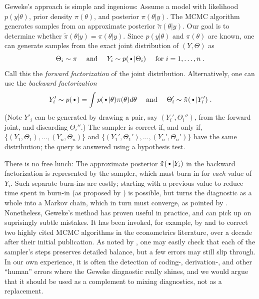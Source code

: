 \documentclass{article}
\newcommand{\argdot}{{\,\vcenter{\hbox{\tiny$\bullet$}}\,}}%
\begin{document}
Geweke's approach is simple and ingenious:
Assume a model with 
likelihood $p(y|\theta)$, prior density $\pi(\theta)$, and posterior
$\pi(\theta|y)$. The MCMC algorithm generates samples from an
approximate posterior $\tilde{\pi}(\theta|y)$. Our goal is to 
determine whether $\tilde{\pi}(\theta|y)=\pi(\theta|y)$. 
Since $p(y|\theta)$ and $\pi(\theta)$ are known, one can generate
samples from the exact joint distribution of $(Y,\Theta)$ as
\begin{equation}
  \Theta_i\sim \pi
  \quad\text{ and }\quad
  Y_i\sim p(\argdot|\Theta_i)\quad\text{ for }i=1,\ldots,n\;.
  \label{eq:ancestralsampling}
\end{equation}
Call this the \emph{forward factorization} of the joint distribution.
Alternatively, one can use the \emph{backward factorization}
\begin{equation*}
  Y'_i\sim p(\argdot)=\int p(\argdot|\theta)\pi(\theta)d\theta
  \quad\text{ and }\quad
  \Theta'_i\sim\tilde{\pi}(\argdot|Y'_i)\;.
\end{equation*}
(Note $Y'_i$ can be generated by drawing a pair, say $(Y_i',\Theta_i'')$, from the forward joint,
and discarding $\Theta_i''$.) The sampler is correct if, and only if, $\{(Y_1,\Theta_1),\ldots,(Y_n,\Theta_n)\}$
and $\{(Y_1',\Theta_1'),\ldots,(Y_n',\Theta_n')\}$ have the same distribution; 
the query is answered using a hypothesis test.

There is no free lunch: The approximate posterior
$\tilde{\pi}(\argdot|Y_i)$ in the backward factorization
is represented by the sampler, which must burn in for \emph{each}
value of $Y_i$. Such separate burn-ins are costly; starting with a previous value to reduce time spent in burn-in (as proposed by \cite{geweke_getting_2004}) is possible, 
but turns the diagnostic as a whole into a Markov chain,
 which in turn must converge, as pointed by \citet{talts_validating_2018}.
Nonetheless, Geweke's method has proven useful in practice, and can pick up
on suprisingly subtle mistakes.
It has been invoked, for example, by \citet{del_negro_time_2015} and
\citet{karlsson_corrigendum_2017} to correct two highly cited MCMC
algorithms in the econometrics literature, over a decade after their
initial publication.
As noted by \citet{grosse_testing_2014}, one may easily check that each of the sampler's steps preserves detailed balance, but a few errors may still slip through. 
In our own experience, it is often the detection of coding-,
derivation-, and other ``human'' errors where the Geweke diagnostic really
shines, and we would argue that it should be used as a complement to
mixing diagnostics, not as a replacement.
\end{document}
